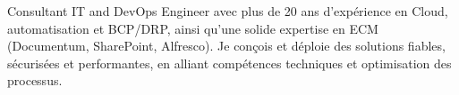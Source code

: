 \par{
Consultant IT and DevOps Engineer avec plus de 20 ans d’expérience en Cloud, automatisation et BCP/DRP, ainsi qu’une solide expertise en ECM (Documentum, SharePoint, Alfresco). Je conçois et déploie des solutions fiables, sécurisées et performantes, en alliant compétences techniques et optimisation des processus.
}